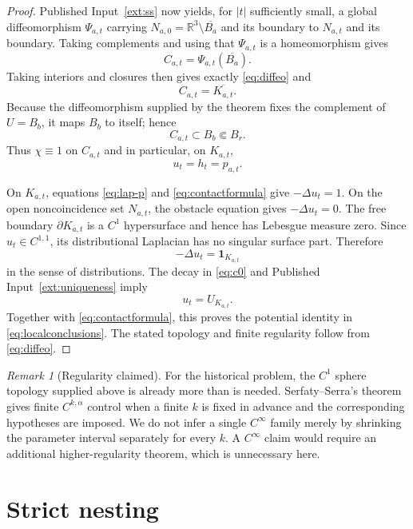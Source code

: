 \documentclass[11pt]{article}
\theoremstyle{definition}
\theoremstyle{remark}
\newtheorem{remark}[theorem]{Remark}
\newcommand{\R}{\mathbb{R}}
\newcommand{\lap}{\Delta}
\newcommand{\1}{\mathbf{1}}
\begin{document}
\begin{proof}
Published Input~\ref{ext:ss} now yields, for $|t|$ sufficiently small, a global diffeomorphism $\Psi_{a,t}$ carrying $N_{a,0}=\R^3\setminus\overline{B_a}$ and its boundary to $N_{a,t}$ and its boundary. Taking complements and using that $\Psi_{a,t}$ is a homeomorphism gives
\[
 C_{a,t}=\Psi_{a,t}(\overline{B_a}).
\]
Taking interiors and closures then gives exactly \eqref{eq:diffeo} and
\[
 C_{a,t}=\overline{K_{a,t}}.
\]
Because the diffeomorphism supplied by the theorem fixes the complement of $U=B_b$, it maps $B_b$ to itself; hence
\[
 C_{a,t}\subset B_b\Subset B_r.
\]
Thus $\chi\equiv1$ on $C_{a,t}$ and in particular, on $K_{a,t}$,
\begin{equation}\label{eq:contactformula}
 u_t=h_t=p_{a,t}.
\end{equation}

On $K_{a,t}$, equations \eqref{eq:lap-p} and \eqref{eq:contactformula} give $-\lap u_t=1$. On the open noncoincidence set $N_{a,t}$, the obstacle equation gives $-\lap u_t=0$. The free boundary $\partial K_{a,t}$ is a $C^1$ hypersurface and hence has Lebesgue measure zero. Since $u_t\in C^{1,1}$, its distributional Laplacian has no singular surface part. Therefore
\begin{equation}\label{eq:distribution}
 -\lap u_t=\1_{K_{a,t}}
\end{equation}
in the sense of distributions. The decay in \eqref{eq:c0} and Published Input~\ref{ext:uniqueness} imply
\[
 u_t=U_{K_{a,t}}.
\]
Together with \eqref{eq:contactformula}, this proves the potential identity in \eqref{eq:localconclusions}. The stated topology and finite regularity follow from \eqref{eq:diffeo}.
\end{proof}

\begin{remark}[Regularity claimed]
For the historical problem, the $C^1$ sphere topology supplied above is already more than is needed. Serfaty--Serra's theorem gives finite $C^{k,\alpha}$ control when a finite $k$ is fixed in advance and the corresponding hypotheses are imposed. We do not infer a single $C^\infty$ family merely by shrinking the parameter interval separately for every $k$. A $C^\infty$ claim would require an additional higher-regularity theorem, which is unnecessary here.
\end{remark}

\section{Strict nesting}
\end{document}
